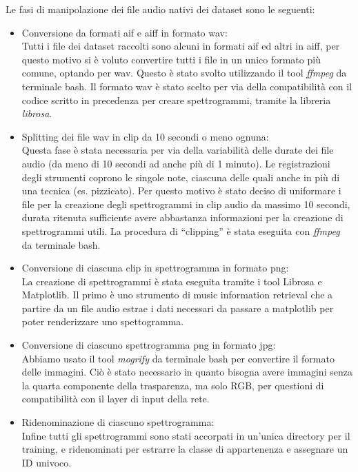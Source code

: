 \documentclass{article}
\begin{document}
Le fasi di manipolazione dei file audio nativi dei dataset sono le seguenti:
\begin{itemize}
    \item Conversione da formati aif e aiff in formato wav:\\
    Tutti i file dei dataset raccolti sono alcuni in formati aif ed altri in aiff, per questo motivo si è voluto convertire 
    tutti i file in un unico formato più comune, optando per wav. Questo è stato svolto utilizzando il tool \textit{ffmpeg} da terminale bash. 
    Il formato wav è stato scelto per via della compatibilità con il codice scritto in precedenza per creare spettrogrammi, tramite la libreria \textit{librosa}.
    \item Splitting dei file wav in clip da 10 secondi o meno ognuna:\\
    Questa fase è stata necessaria per via della variabilità delle durate dei file audio (da meno di 10 secondi ad anche più di 1 minuto).
    Le registrazioni degli strumenti coprono le singole note, ciascuna delle quali anche in più di una tecnica (es. pizzicato).
    Per questo motivo è stato deciso di uniformare i file per la creazione degli spettrogrammi in clip audio da massimo 10 secondi, durata ritenuta sufficiente 
    avere abbastanza informazioni per la creazione di spettrogrammi utili. La procedura di ``clipping'' è stata eseguita con 
    \textit{ffmpeg} da terminale bash.  
    \item Conversione di ciascuna clip in spettrogramma in formato png:\\
    La creazione di spettrogrammi è stata eseguita tramite i tool Librosa e Matplotlib. Il primo è uno strumento di music information retrieval che a partire
    da un file audio estrae i dati necessari da passare a matplotlib per poter renderizzare uno spettogramma.
    \item Conversione di ciascuno spettrogramma png in formato jpg:\\
    Abbiamo usato il tool \textit{mogrify} da terminale bash per convertire il formato delle immagini. 
    Ciò è stato necessario in quanto bisogna avere immagini
    senza la quarta componente della trasparenza, ma solo RGB, per questioni di compatibilità con il layer di input della rete. 
    \item Ridenominazione di ciascuno spettrogramma:\\
    Infine tutti gli spettrogrammi sono stati accorpati in un'unica directory per il training, e ridenominati per estrarre la classe di appartenenza 
    e assegnare un ID univoco.
\end{itemize}
\end{document}
